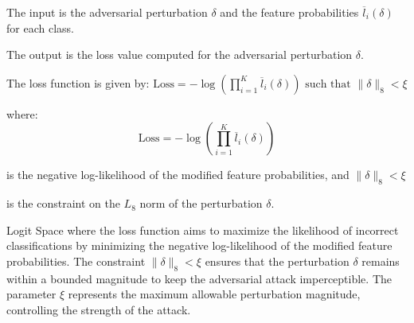 The input is the adversarial perturbation $\delta$ and the feature probabilities $\overline{l}_i(\delta)$ for each class.

The output is the loss value computed for the adversarial perturbation $\delta$.

The loss function is given by:
$
\text{Loss} = -\log \left( \prod_{i=1}^{K} \overline{l}_i(\delta) \right)
\text{ such that } \| \delta \|_8 < \xi$

where:
\begin{equation*}
\text{Loss} = -\log \left( \prod_{i=1}^{K} \overline{l}_i(\delta) \right)
\end{equation*}

is the negative log-likelihood of the modified feature probabilities, and $\| \delta \|_8 < \xi$

is the constraint on the $L_8$ norm of the perturbation $\delta$.

Logit Space where the loss function aims to maximize the likelihood of incorrect classifications by minimizing the negative log-likelihood of the modified feature probabilities. The constraint $\| \delta \|_8 < \xi$ ensures that the perturbation $\delta$ remains within a bounded magnitude to keep the adversarial attack imperceptible. The parameter $\xi$ represents the maximum allowable perturbation magnitude, controlling the strength of the attack.
